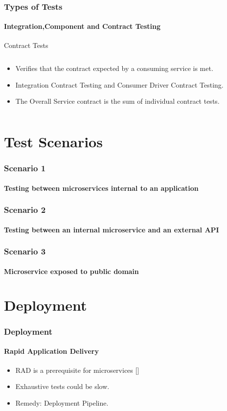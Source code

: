 \documentclass{beamer}
\begin{document}
\begin{frame}
	\frametitle{Types of Tests}	
	\framesubtitle{Integration,Component and Contract Testing}
Contract Tests
\begin{columns}
 \begin{column}{.9\textwidth}
	\begin{itemize}
		\item Verifies that the contract expected by a consuming service is met.
		\item Integration Contract Testing and Consumer Driver Contract Testing.
\item The Overall Service contract is the sum of individual contract tests.
		
	\end{itemize}
\end{column}

\end{columns}
\end{frame}



\section{Test Scenarios}

\begin{frame}
	\frametitle{Scenario 1}
	\framesubtitle{Testing between microservices internal to an application}

\end{frame}

\begin{frame}
	\frametitle{Scenario 2}
	\framesubtitle{Testing between an internal microservice and an external API}

\end{frame}

\begin{frame}
	\frametitle{Scenario 3}
	\framesubtitle{Microservice exposed to public domain}




\end{frame}


\section{Deployment}

\begin{frame}
	\frametitle{Deployment}
	\framesubtitle{Rapid Application Delivery}
	\begin{itemize}
		\item RAD is a prerequisite for microservices []
		\item Exhaustive tests could be slow.
		\item Remedy: Deployment Pipeline.
	\end{itemize}
\end{frame}
\end{document}
